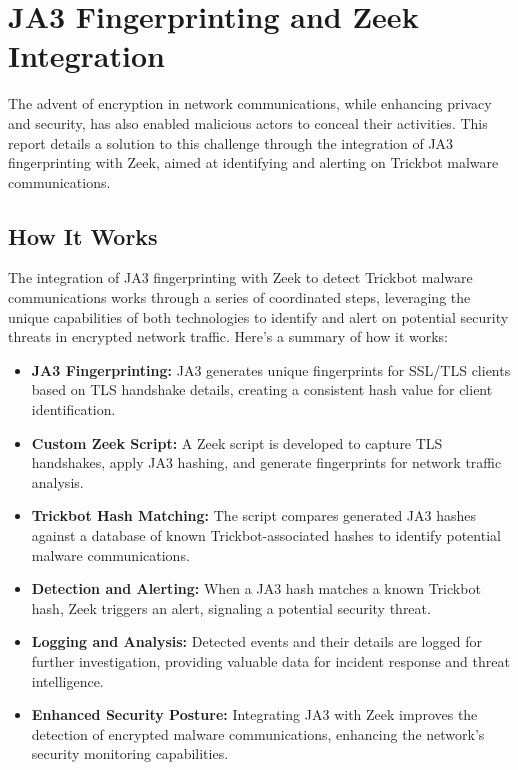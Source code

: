 \section{JA3 Fingerprinting and Zeek Integration}
The advent of encryption in network communications, while enhancing privacy and security, has also enabled malicious actors to conceal their activities. This report details a solution to this challenge through the integration of JA3 fingerprinting with Zeek, aimed at identifying and alerting on Trickbot malware communications.
\subsection{How It Works}
The integration of JA3 fingerprinting with Zeek to detect Trickbot malware communications works through a series of coordinated steps, leveraging the unique capabilities of both technologies to identify and alert on potential security threats in encrypted network traffic. Here's a summary of how it works:

\begin{itemize}
    \item \textbf{JA3 Fingerprinting:} JA3 generates unique fingerprints for SSL/TLS clients based on TLS handshake details, creating a consistent hash value for client identification.

    \item \textbf{Custom Zeek Script:} A Zeek script is developed to capture TLS handshakes, apply JA3 hashing, and generate fingerprints for network traffic analysis.

    \item \textbf{Trickbot Hash Matching:} The script compares generated JA3 hashes against a database of known Trickbot-associated hashes to identify potential malware communications.

    \item \textbf{Detection and Alerting:} When a JA3 hash matches a known Trickbot hash, Zeek triggers an alert, signaling a potential security threat.

    \item \textbf{Logging and Analysis:} Detected events and their details are logged for further investigation, providing valuable data for incident response and threat intelligence.

    \item \textbf{Enhanced Security Posture:} Integrating JA3 with Zeek improves the detection of encrypted malware communications, enhancing the network's security monitoring capabilities.
    
\end{itemize}

